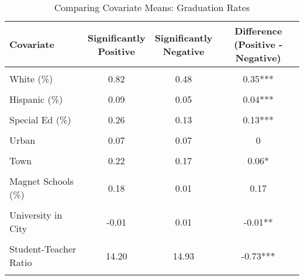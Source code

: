 \begin{table}[!h]
\centering
\caption{\label{tab:cov_means_afgr}Comparing Covariate Means: Graduation Rates}
\centering
\begin{tabular}[t]{lccc}
\toprule
Covariate & \makecell[c]{Significantly\\Positive} & \makecell[c]{Significantly\\Negative} & \makecell[c]{Difference\\(Positive - Negative)}\\
\midrule
\cellcolor{gray!10}{Log of Enrollment} & \cellcolor{gray!10}{7.23} & \cellcolor{gray!10}{6.98} & \cellcolor{gray!10}{0.26**}\\
White (\%) & 0.82 & 0.48 & 0.35***\\
\cellcolor{gray!10}{Black (\%)} & \cellcolor{gray!10}{0.05} & \cellcolor{gray!10}{0.39} & \cellcolor{gray!10}{-0.34***}\\
Hispanic (\%) & 0.09 & 0.05 & 0.04***\\
\cellcolor{gray!10}{Free/Reduced Lunch (\%)} & \cellcolor{gray!10}{0.25} & \cellcolor{gray!10}{0.48} & \cellcolor{gray!10}{-0.23***}\\
Special Ed (\%) & 0.26 & 0.13 & 0.13***\\
\cellcolor{gray!10}{Baseline Performance} & \cellcolor{gray!10}{0.83} & \cellcolor{gray!10}{0.57} & \cellcolor{gray!10}{0.26***}\\
Urban & 0.07 & 0.07 & 0\\
\cellcolor{gray!10}{Suburb} & \cellcolor{gray!10}{0.22} & \cellcolor{gray!10}{0.14} & \cellcolor{gray!10}{0.08***}\\
Town & 0.22 & 0.17 & 0.06*\\
\cellcolor{gray!10}{Rural} & \cellcolor{gray!10}{0.48} & \cellcolor{gray!10}{0.62} & \cellcolor{gray!10}{-0.14***}\\
Magnet Schools (\%) & 0.18 & 0.01 & 0.17\\
\cellcolor{gray!10}{City Population (standardized)} & \cellcolor{gray!10}{0.00} & \cellcolor{gray!10}{0.00} & \cellcolor{gray!10}{0}\\
University in City & -0.01 & 0.01 & -0.01**\\
\cellcolor{gray!10}{Per Pupil Revenue} & \cellcolor{gray!10}{11411.08} & \cellcolor{gray!10}{8940.67} & \cellcolor{gray!10}{2470.41***}\\
Student-Teacher Ratio & 14.20 & 14.93 & -0.73***\\
\cellcolor{gray!10}{Teacher Salary} & \cellcolor{gray!10}{81975.53} & \cellcolor{gray!10}{65372.43} & \cellcolor{gray!10}{16603.09***}\\

\end{tabular}
\end{table}
